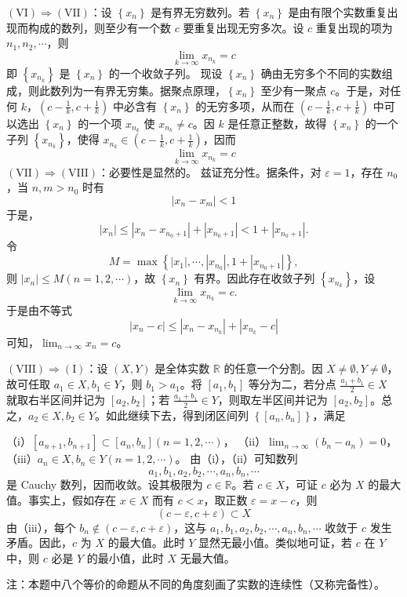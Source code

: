 $(\mathrm{VI})\Rightarrow(\mathrm{VII})$：设 $\left\{x_n\right\}$ 是有界无穷数列。若 $\left\{x_n\right\}$ 是由有限个实数重复出现而构成的数列，则至少有一个数 $c$ 要重复出现无穷多次。设 $c$ 重复出现的项为 $n_1, n_2, \cdots$，则
\[
\lim_{k \rightarrow \infty} x_{n_k}=c
\]
即 $\left\{x_{n_k}\right\}$ 是 $\left\{x_n\right\}$ 的一个收敛子列。
现设 $\left\{x_n\right\}$ 确由无穷多个不同的实数组成，则此数列为一有界无穷集。据聚点原理，$\left\{x_n\right\}$ 至少有一聚点 $c$。于是，对任何 $k$，$\left(c-\frac{1}{k}, c+\frac{1}{k}\right)$ 中必含有 $\left\{x_n\right\}$ 的无穷多项，从而在 $\left(c-\frac{1}{k}, c+\frac{1}{k}\right)$ 中可以选出 $\left\{x_n\right\}$ 的一个项 $x_{n_k}$ 使 $x_{n_k} \neq c$。因 $k$ 是任意正整数，故得 $\left\{x_n\right\}$ 的一个子列 $\left\{x_{n_k}\right\}$，使得 $x_{n_k} \in\left(c-\frac{1}{k}, c+\frac{1}{k}\right)$，因而
\[
\lim_{k \rightarrow \infty} x_{n_k}=c
\]
$(\mathrm{VII}) \Rightarrow(\mathrm{VIII})$：必要性是显然的。
兹证充分性。据条件，对 $\varepsilon=1$，存在 $n_0$，当 $n, m>n_0$ 时有
\[
\left|x_n-x_m\right|<1
\]
于是，
\[
\left|x_n\right| \leqslant\left|x_n-x_{n_0+1}\right|+\left|x_{n_0+1}\right|<1+\left|x_{n_0+1}\right|.
\]
令
\[
M=\max \left\{\left|x_1\right|, \cdots,\left|x_{n_0}\right|, 1+\left|x_{n_0+1}\right|\right\},
\]
则 $\left|x_n\right| \leqslant M(n=1,2, \cdots)$，故 $\left\{x_n\right\}$ 有界。因此存在收敛子列 $\left\{x_{n_k}\right\}$，设
\[
\lim_{k \rightarrow \infty} x_{n_k}=c.
\]
于是由不等式
\[
\left|x_n-c\right| \leqslant\left|x_n-x_{n_k}\right|+\left|x_{n_k}-c\right|
\]
可知，$\lim_{n \rightarrow \infty} x_n=c$。

$(\mathrm{VIII}) \Rightarrow(\mathrm{I})$：设 $(X, Y)$ 是全体实数 $\mathbb{R}$ 的任意一个分割。因 $X \neq \emptyset, Y \neq \emptyset$，故可任取 $a_1 \in X, b_1 \in Y$，则 $b_1>a_1$。将 $\left[a_1, b_1\right]$ 等分为二，若分点 $\frac{a_1+b_1}{2} \in X$ 就取右半区间并记为 $\left[a_2, b_2\right]$；若 $\frac{a_1+b_1}{2} \in Y$，则取左半区间并记为 $\left[a_2, b_2\right]$。总之，$a_2 \in X, b_2 \in Y$。如此继续下去，得到闭区间列 $\left\{\left[a_n, b_n\right]\right\}$，满足

（i）$\left[a_{n+1}, b_{n+1}\right] \subset\left[a_n, b_n\right](n=1,2, \cdots)$，
（ii）$\lim_{n \rightarrow \infty}\left(b_n-a_n\right)=0$，
（iii）$a_n \in X, b_n \in Y(n=1,2, \cdots)$。
由（i），（ii）可知数列
\[
a_1, b_1, a_2, b_2, \cdots, a_n, b_n, \cdots
\]
是 Cauchy 数列，因而收敛。设其极限为 $c \in \mathbb{R}$。若 $c \in X$，可证 $c$ 必为 $X$ 的最大值。事实上，假如存在 $x \in X$ 而有 $c<x$，取正数 $\varepsilon=x-c$，则
\[
(c-\varepsilon, c+\varepsilon) \subset X
\]
由（iii），每个 $b_n \notin(c-\varepsilon, c+\varepsilon)$，这与 $a_1, b_1, a_2, b_2, \cdots, a_n, b_n, \cdots$ 收敛于 $c$ 发生矛盾。因此，$c$ 为 $X$ 的最大值。此时 $Y$ 显然无最小值。类似地可证，若 $c$ 在 $Y$ 中，则 $c$ 必是 $Y$ 的最小值，此时 $X$ 无最大值。

注：本题中八个等价的命题从不同的角度刻画了实数的连续性（又称完备性）。

